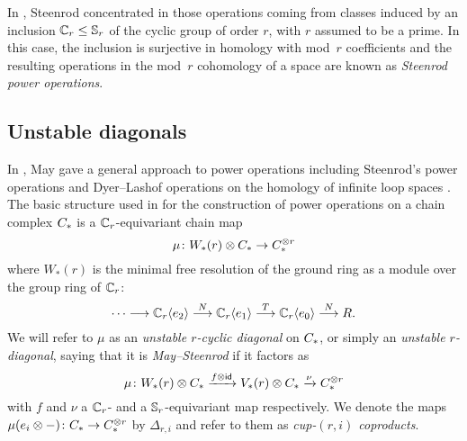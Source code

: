 In \cite{steenrod1953cyclic}, Steenrod concentrated in those operations coming from classes induced by an inclusion $\mathbb{C}_r \leq \mathbb{S}_r$ of the cyclic group of order $r$, with $r$ assumed to be a prime.
In this case, the inclusion is surjective in homology with mod~$r$ coefficients and the resulting operations in the mod~$r$ cohomology of a space are known as \textit{Steenrod power operations}.

\subsection{Unstable diagonals}

In \cite{may1970general}, May gave a general approach to power operations including Steenrod's power operations \cite{steenrod1962cohomology} and Dyer--Lashof operations on the homology of infinite loop spaces \cite{dyer62lashof}.
The basic structure used in \cite{may1970general} for the construction of power operations on a chain complex $C_{*}$ is a $\mathbb{C}_r$-equivariant chain map
\[
\mu \colon W_*(r) \otimes C_{*} \to C_{*}^{\otimes r}
\]
where $W_*(r)$ is the minimal free resolution of the ground ring as a module over the group ring of $\mathbb{C}_r$:
\[
\dotsb \longrightarrow \mathbb{C}_r\langle e_2\rangle \overset{N}{\longrightarrow}
\mathbb{C}_r\langle e_1\rangle \overset{T}{\longrightarrow}
\mathbb{C}_r\langle e_0\rangle \overset{N}{\longrightarrow}
R.
\]
We will refer to $\mu$ as an \textit{unstable $r$-cyclic diagonal} on $C_{*}$, or simply an \textit{unstable $r$-diagonal}, saying that it is \textit{May--Steenrod} if it factors as
\[
\mu \colon W_*(r) \otimes C_{*} \xrightarrow{f \otimes \mathsf{id}} V_*(r) \otimes C_{*} \xrightarrow{\nu} C_{*}^{\otimes r}
\]
with $f$ and $\nu$ a $\mathbb{C}_r$- and a $\mathbb{S}_r$-equivariant map respectively.
We denote the maps $\mu(e_i \otimes -) \colon C_{*} \to C_{*}^{\otimes r}$ by $\Delta_{r,i}$ and refer to them as \textit{cup-$(r,i)$ coproducts}.

